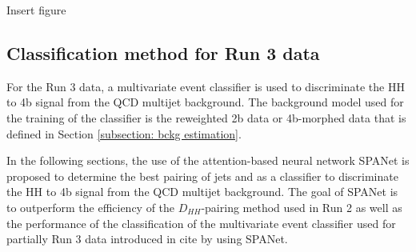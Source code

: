 Insert figure

\subsection{Classification method for Run 3 data}

For the Run 3 data, a multivariate event classifier is used to discriminate the HH to 4b signal from the QCD multijet background. The background model used for the training of the classifier is the reweighted 2b data or 4b-morphed data that is defined in Section \ref{subsection: bckg estimation}.

\vspace{1 cm}

In the following sections, the use of the attention-based neural network SPANet is proposed to determine the best pairing of jets and as a classifier to discriminate the HH to 4b signal from the QCD multijet background. The goal of SPANet is to outperform the efficiency of the $D_{HH}$-pairing method used in Run 2 as well as the performance of the classification of the multivariate event classifier used for partially Run 3 data introduced in cite by using SPANet.
